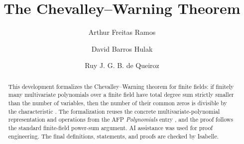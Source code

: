 \documentclass[11pt,a4paper]{article}
\begin{document}
\title{The Chevalley--Warning Theorem}
\author{Arthur Freitas Ramos \and David Barros Hulak \and Ruy J. G. B. de Queiroz}
\maketitle

\begin{abstract}
This development formalizes the Chevalley--Warning theorem for finite fields:
if finitely many multivariate polynomials over a finite field have total
degree sum strictly smaller than the number of variables, then the number of
their common zeros is divisible by the characteristic
\cite{Chevalley1935,Warning1935}.  The formalization reuses the concrete
multivariate-polynomial representation and operations from the AFP
\emph{Polynomials} entry \cite{Polynomials-AFP}, and the proof follows the
standard finite-field power-sum argument.
AI assistance was used for proof engineering.  The final definitions,
statements, and proofs are checked by Isabelle.
\end{abstract}

\tableofcontents





\end{document}
